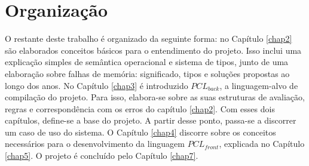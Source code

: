 \section{Organização}

O restante deste trabalho é organizado da seguinte forma: no Capítulo \ref{chap2} são elaborados conceitos básicos para o entendimento do projeto. Isso inclui uma explicação simples de semântica operacional e sistema de tipos, junto de uma elaboração sobre falhas de memória: significado, tipos e soluções propostas ao longo dos anos. No Capítulo \ref{chap3} é introduzido $PCL_{back}$, a linguagem-alvo de compilação do projeto. Para isso, elabora-se sobre as suas estruturas de avaliação, regras e correspondência com os erros do capítulo \ref{chap2}. Com esses dois capítulos, define-se a base do projeto. A partir desse ponto, passa-se a discorrer um caso de uso do sistema. O Capítulo \ref{chap4} discorre sobre os conceitos necessários para o desenvolvimento da linguagem $PCL_{front}$, explicada no Capítulo \ref{chap5}. O projeto é concluído pelo Capítulo \ref{chap7}.
